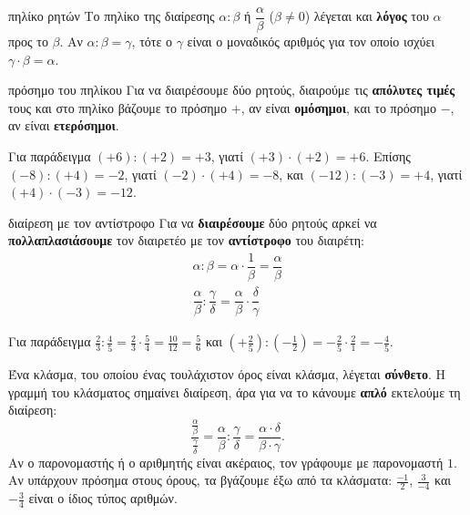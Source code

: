 
\begin{orismos}{πηλίκο ρητών}
Το πηλίκο της διαίρεσης $\alpha:\beta$ ή $\dfrac{\alpha}{\beta}$ ($\beta\neq0$) λέγεται και \textbf{λόγος} του $\alpha$ προς το $\beta$. Αν $\alpha:\beta=\gamma$, τότε ο $\gamma$ είναι ο μοναδικός αριθμός για τον οποίο ισχύει $\gamma\cdot\beta=\alpha$.
\end{orismos}

\begin{kanonas}{πρόσημο του πηλίκου}
Για να διαιρέσουμε δύο ρητούς, διαιρούμε τις \textbf{απόλυτες τιμές} τους και στο πηλίκο βάζουμε το πρόσημο $+$, αν είναι \textbf{ομόσημοι}, και το πρόσημο $-$, αν είναι \textbf{ετερόσημοι}.
\end{kanonas}

Για παράδειγμα $(+6):(+2)=+3$, γιατί $(+3)\cdot(+2)=+6$. Επίσης $(-8):(+4)=-2$, γιατί $(-2)\cdot(+4)=-8$, και $(-12):(-3)=+4$, γιατί $(+4)\cdot(-3)=-12$.

\begin{kanonas}{διαίρεση με τον αντίστροφο}
Για να \textbf{διαιρέσουμε} δύο ρητούς αρκεί να \textbf{πολλαπλασιάσουμε} τον διαιρετέο με τον \textbf{αντίστροφο} του διαιρέτη:
\begin{gather*}\alpha:\beta=\alpha\cdot\dfrac{1}{\beta}=\dfrac{\alpha}{\beta}\\[4pt]\dfrac{\alpha}{\beta}:\dfrac{\gamma}{\delta}=\dfrac{\alpha}{\beta}\cdot\dfrac{\delta}{\gamma}\end{gather*}
\end{kanonas}

Για παράδειγμα $\frac{2}{3}:\frac{4}{5}=\frac{2}{3}\cdot\frac{5}{4}=\frac{10}{12}=\frac{5}{6}$ και $\left(+\frac{2}{5}\right):\left(-\frac{1}{2}\right)=-\frac{2}{5}\cdot\frac{2}{1}=-\frac{4}{5}$.


Ένα κλάσμα, του οποίου ένας τουλάχιστον όρος είναι κλάσμα, λέγεται \textbf{σύνθετο}. Η γραμμή του κλάσματος σημαίνει διαίρεση, άρα για να το κάνουμε \textbf{απλό} εκτελούμε τη διαίρεση:
$$\dfrac{\frac{\alpha}{\beta}}{\frac{\gamma}{\delta}}=\dfrac{\alpha}{\beta}:\dfrac{\gamma}{\delta}=\dfrac{\alpha\cdot\delta}{\beta\cdot\gamma}.$$
Αν ο παρονομαστής ή ο αριθμητής είναι ακέραιος, τον γράφουμε με παρονομαστή $1$. Αν υπάρχουν πρόσημα στους όρους, τα βγάζουμε έξω από τα κλάσματα: $\frac{-1}{2}$, $\frac{3}{-4}$ και $-\frac{3}{4}$ είναι ο ίδιος τύπος αριθμών.


